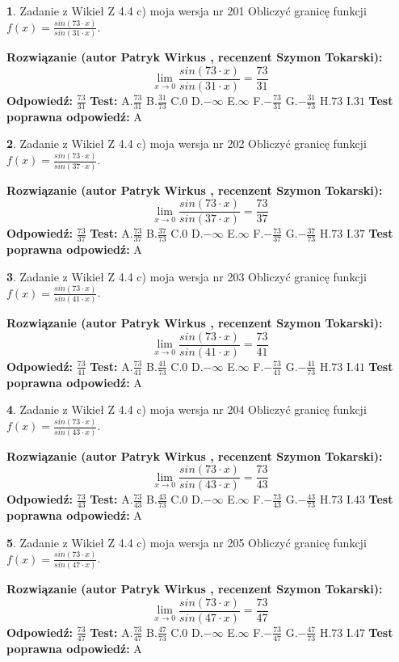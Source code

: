 \documentclass[12pt, a4paper]{article}
\theoremstyle{definition} %
\newtheorem{zad}{}
\newcommand{\zadStart}[1]{\begin{zad}#1\newline}
\newcommand{\zadStop}{\end{zad}}
\newcommand{\rozwStart}[2]{\noindent \textbf{Rozwiązanie (autor #1 , recenzent #2): }\newline}
\newcommand{\rozwStop}{\newline}
\newcommand{\odpStart}{\noindent \textbf{Odpowiedź:}\newline}
\newcommand{\odpStop}{\newline}
\newcommand{\testStart}{\noindent \textbf{Test:}\newline}
\newcommand{\testStop}{\newline}
\newcommand{\kluczStart}{\noindent \textbf{Test poprawna odpowiedź:}\newline}
\newcommand{\kluczStop}{\newline}
\begin{document}
\zadStart{Zadanie z Wikieł Z 4.4 c) moja wersja nr 201}
Obliczyć granicę funkcji $f(x)=\frac{sin(73\cdot x)}{sin(31\cdot x)}$.
\zadStop
\rozwStart{Patryk Wirkus}{Szymon Tokarski}
$$\lim\limits_{x\to 0}\frac{sin(73\cdot x)}{sin(31\cdot x)}=
\frac{73}{31}$$
\rozwStop
\odpStart
$\frac{73}{31}$
\odpStop
\testStart
A.$\frac{73}{31}$
B.$\frac{31}{73}$
C.$0$
D.$-\infty$
E.$\infty$
F.$-\frac{73}{31}$
G.$-\frac{31}{73}$
H.$73$
I.$31$
\testStop
\kluczStart
A
\kluczStop



\zadStart{Zadanie z Wikieł Z 4.4 c) moja wersja nr 202}
Obliczyć granicę funkcji $f(x)=\frac{sin(73\cdot x)}{sin(37\cdot x)}$.
\zadStop
\rozwStart{Patryk Wirkus}{Szymon Tokarski}
$$\lim\limits_{x\to 0}\frac{sin(73\cdot x)}{sin(37\cdot x)}=
\frac{73}{37}$$
\rozwStop
\odpStart
$\frac{73}{37}$
\odpStop
\testStart
A.$\frac{73}{37}$
B.$\frac{37}{73}$
C.$0$
D.$-\infty$
E.$\infty$
F.$-\frac{73}{37}$
G.$-\frac{37}{73}$
H.$73$
I.$37$
\testStop
\kluczStart
A
\kluczStop



\zadStart{Zadanie z Wikieł Z 4.4 c) moja wersja nr 203}
Obliczyć granicę funkcji $f(x)=\frac{sin(73\cdot x)}{sin(41\cdot x)}$.
\zadStop
\rozwStart{Patryk Wirkus}{Szymon Tokarski}
$$\lim\limits_{x\to 0}\frac{sin(73\cdot x)}{sin(41\cdot x)}=
\frac{73}{41}$$
\rozwStop
\odpStart
$\frac{73}{41}$
\odpStop
\testStart
A.$\frac{73}{41}$
B.$\frac{41}{73}$
C.$0$
D.$-\infty$
E.$\infty$
F.$-\frac{73}{41}$
G.$-\frac{41}{73}$
H.$73$
I.$41$
\testStop
\kluczStart
A
\kluczStop



\zadStart{Zadanie z Wikieł Z 4.4 c) moja wersja nr 204}
Obliczyć granicę funkcji $f(x)=\frac{sin(73\cdot x)}{sin(43\cdot x)}$.
\zadStop
\rozwStart{Patryk Wirkus}{Szymon Tokarski}
$$\lim\limits_{x\to 0}\frac{sin(73\cdot x)}{sin(43\cdot x)}=
\frac{73}{43}$$
\rozwStop
\odpStart
$\frac{73}{43}$
\odpStop
\testStart
A.$\frac{73}{43}$
B.$\frac{43}{73}$
C.$0$
D.$-\infty$
E.$\infty$
F.$-\frac{73}{43}$
G.$-\frac{43}{73}$
H.$73$
I.$43$
\testStop
\kluczStart
A
\kluczStop



\zadStart{Zadanie z Wikieł Z 4.4 c) moja wersja nr 205}
Obliczyć granicę funkcji $f(x)=\frac{sin(73\cdot x)}{sin(47\cdot x)}$.
\zadStop
\rozwStart{Patryk Wirkus}{Szymon Tokarski}
$$\lim\limits_{x\to 0}\frac{sin(73\cdot x)}{sin(47\cdot x)}=
\frac{73}{47}$$
\rozwStop
\odpStart
$\frac{73}{47}$
\odpStop
\testStart
A.$\frac{73}{47}$
B.$\frac{47}{73}$
C.$0$
D.$-\infty$
E.$\infty$
F.$-\frac{73}{47}$
G.$-\frac{47}{73}$
H.$73$
I.$47$
\testStop
\kluczStart
A
\kluczStop
\end{document}
